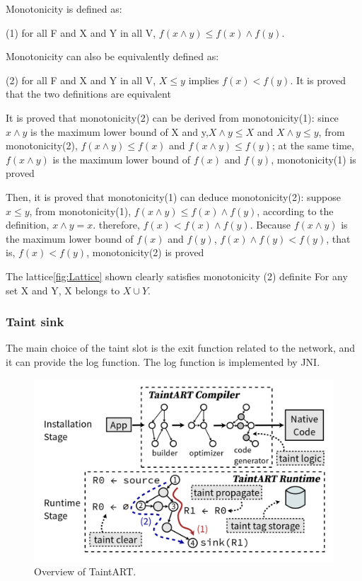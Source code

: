 \documentclass{article}
\begin{document}
Monotonicity is defined as: 

(1) for all F and X and Y in all V, $f (x \wedge  y) \leq f (x) \wedge f (y)$. 

Monotonicity can also be equivalently defined as: 

(2) for all F and X and Y in all V, $X \leq y$ implies $f (x) < f (y)$. It is proved that the two definitions are equivalent

It is proved that monotonicity(2) can be derived from monotonicity(1): since $x \wedge y$ is the maximum lower bound of X and y,$ X \wedge y \leq X$ and $X \wedge y \leq y$, from monotonicity(2), $f (x \wedge y) \leq f (x)$ and $f (x \wedge y) \leq f (y)$; at the same time, $f (x \wedge y)$ is the maximum lower bound of $f (x)$ and $f (y)$, monotonicity(1) is proved

Then, it is proved that monotonicity(1) can deduce monotonicity(2): suppose $x \leq y$, from monotonicity(1), $f (x \wedge y) \leq f (x) \wedge f (y)$, according to the definition, $x \wedge y = x$. therefore, $f (x) < f (x) \wedge f (y)$. Because $f (x \wedge y)$ is the maximum lower bound of $f (x)$ and $f (y)$, $f (x) \wedge f (y) < f (y)$, that is, $f (x) < f (y)$, monotonicity(2) is proved

The lattice\ref{fig:Lattice} shown clearly satisfies monotonicity (2) definite For any set X and Y, X belongs to $X \cup Y$.

\subsubsection{Taint sink}
The main choice of the taint slot is the exit function related to the network, and it can provide the log function. The log function is implemented by JNI.
\begin{figure}[ht]
  \centering
  \includegraphics[scale=0.2]{TaintART4.png}
  \caption{Overview of TaintART.}
  \label{fig:TaintART4}
\end{figure}
\end{document}
